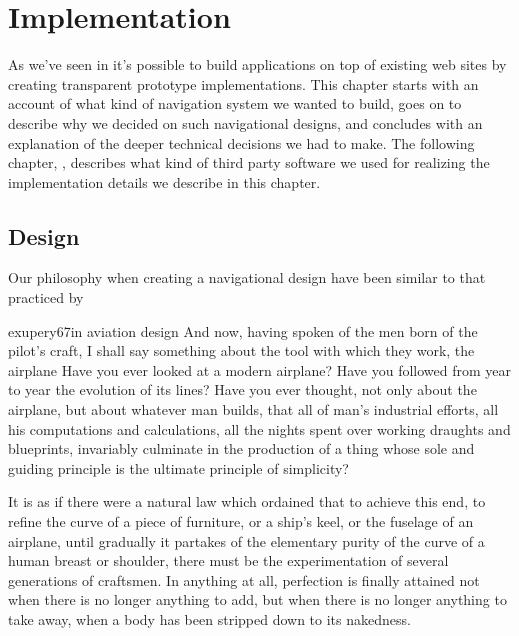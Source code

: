 \chapter{Implementation}
\label{chapter:implementation}


As we've seen in 
it's possible to build applications on top of existing web sites by creating
transparent prototype implementations. This chapter starts with an account of
what kind of navigation system we wanted to build, goes on to describe why we
decided on such navigational designs, and concludes with an explanation of the
deeper technical decisions we had to make. The following chapter,
,
describes what kind of third party software we used for realizing the
implementation details we describe in this chapter.


\section{Design}

Our philosophy when creating a navigational design have been
similar to that practiced by
\begin{fullquotation}[\chap{3}]{exupery67}{in aviation design}
  \noindent
  And now, having spoken of the men born of the pilot's craft, I shall say
  something about the tool with which they work, the airplane Have you
  ever looked at a modern airplane? Have you followed from year to year
  the evolution of its lines? Have you ever thought, not only about the
  airplane, but about whatever man builds, that all of man's industrial
  efforts, all his computations and calculations, all the nights spent
  over working draughts and blueprints, invariably culminate in the
  production of a thing whose sole and guiding principle is the ultimate
  principle of simplicity?

  It is as if there were a natural law which ordained that to achieve this
  end, to refine the curve of a piece of furniture, or a ship's keel, or
  the fuselage of an airplane, until gradually it partakes of the
  elementary purity of the curve of a human breast or shoulder, there must
  be the experimentation of several generations of craftsmen. In anything
  at all, perfection is finally attained not when there is no longer
  anything to add, but when there is no longer anything to take away,
  when a body has been stripped down to its nakedness.
\end{fullquotation}

